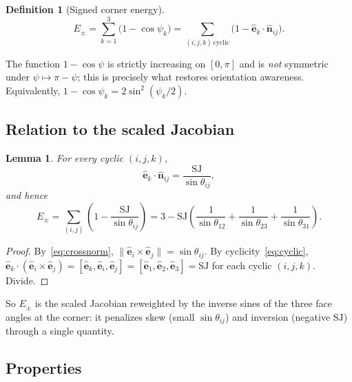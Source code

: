 \documentclass[11pt]{article}
\newtheorem{lemma}{Lemma}
\theoremstyle{definition}
\newtheorem{definition}{Definition}
\theoremstyle{remark}
\newcommand{\uv}[1]{\hat{\bm{#1}}}
\newcommand{\Es}{E_{\pm}}
\newcommand{\SJ}{\mathrm{SJ}}
\begin{document}
\begin{definition}[Signed corner energy]
\begin{equation}
  \boxed{\Es=\sum_{k=1}^{3}\big(1-\cos\psi_k\big)=\sum_{(i,j,k)\,\text{cyclic}}\big(1-\uv{e}_k\cdot\uv{n}_{ij}\big).}
  \label{eq:Es}
\end{equation}
\end{definition}

The function $1-\cos\psi$ is strictly increasing on $[0,\pi]$ and is \emph{not} symmetric under
$\psi\mapsto\pi-\psi$; this is precisely what restores orientation awareness. Equivalently,
$1-\cos\psi_k=2\sin^2(\psi_k/2)$.

\subsection{Relation to the scaled Jacobian}

\begin{lemma}\label{lem:link}
For every cyclic $(i,j,k)$,
\begin{equation}
  \uv{e}_k\cdot\uv{n}_{ij}=\frac{\SJ}{\sin\theta_{ij}},
\end{equation}
and hence
\begin{equation}
  \boxed{\Es=\sum_{(i,j)}\left(1-\frac{\SJ}{\sin\theta_{ij}}\right)
  =3-\SJ\left(\frac{1}{\sin\theta_{12}}+\frac{1}{\sin\theta_{23}}+\frac{1}{\sin\theta_{31}}\right).}
  \label{eq:Eslink}
\end{equation}
\end{lemma}
\begin{proof}
By~\eqref{eq:crossnorm}, $\|\uv{e}_i\times\uv{e}_j\|=\sin\theta_{ij}$. By cyclicity~\eqref{eq:cyclic},
$\uv{e}_k\cdot(\uv{e}_i\times\uv{e}_j)=[\uv{e}_k,\uv{e}_i,\uv{e}_j]=[\uv{e}_1,\uv{e}_2,\uv{e}_3]=\SJ$ for each
cyclic $(i,j,k)$. Divide.
\end{proof}

So $\Es$ is the scaled Jacobian reweighted by the inverse sines of the three face
angles at the corner: it penalizes skew (small $\sin\theta_{ij}$) and inversion (negative $\SJ$)
through a single quantity.

\subsection{Properties}
\end{document}
